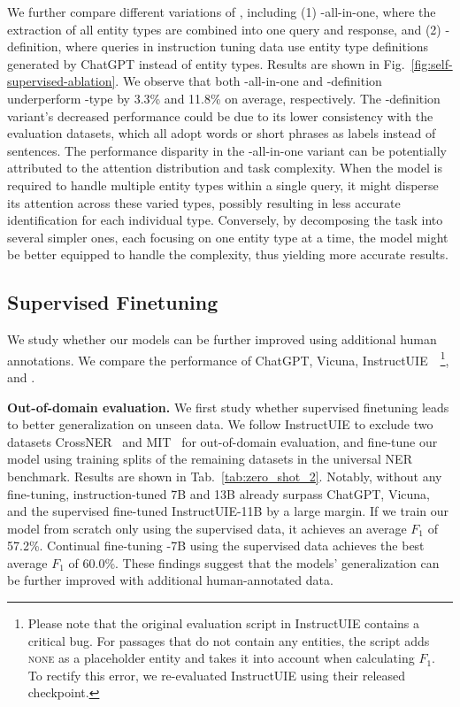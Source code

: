 We further compare different variations of \shortname, including (1) \shortname-all-in-one, where the extraction of all entity types are combined into one query and response, and (2) \shortname-definition, where queries in instruction tuning data use entity type definitions generated by ChatGPT instead of entity types.
Results are shown in Fig.~\ref{fig:self-supervised-ablation}.
We observe that both \shortname-all-in-one and \shortname-definition underperform \shortname-type by 3.3\% and 11.8\% on average, respectively.
The \shortname-definition variant's decreased performance could be due to its lower consistency with the evaluation datasets, which all adopt words or short phrases as labels instead of sentences.
The performance disparity in the \shortname-all-in-one variant can be potentially attributed to the attention distribution and task complexity.
When the model is required to handle multiple entity types within a single query, it might disperse its attention across these varied types, possibly resulting in less accurate identification for each individual type.
Conversely, by decomposing the task into several simpler ones, each focusing on one entity type at a time, the model might be better equipped to handle the complexity, thus yielding more accurate results.

\subsection{Supervised Finetuning}
\label{ssec:results_supervised}
We study whether our models can be further improved using additional human annotations.
We compare the performance of ChatGPT, Vicuna, InstructUIE~\citep{wang2023instructuie}~\footnote{Please note that the original evaluation script in InstructUIE contains a critical bug. For passages that do not contain any entities, the script adds \textsc{none} as a placeholder entity and takes it into account when calculating $F_1$. To rectify this error, we re-evaluated InstructUIE using their released checkpoint.}, and \shortname.

\smallskip
\noindent\textbf{Out-of-domain evaluation.} We first study whether supervised finetuning leads to better generalization on unseen data.
We follow InstructUIE to exclude two datasets CrossNER~\citep{liu2021crossner} and MIT~\citep{liu2013asgard} for out-of-domain evaluation, and fine-tune our model using training splits of the remaining datasets in the universal NER benchmark.
Results are shown in Tab.~\ref{tab:zero_shot_2}.
Notably, without any fine-tuning, instruction-tuned \shortname{} 7B and 13B already surpass ChatGPT, Vicuna, and the supervised fine-tuned InstructUIE-11B by a large margin.
If we train our model from scratch only using the supervised data, it achieves an average $F_1$ of 57.2\%.
Continual fine-tuning \shortname-7B using the supervised data achieves the best average $F_1$ of 60.0\%.
These findings suggest that the models' generalization can be further improved with additional human-annotated data.

